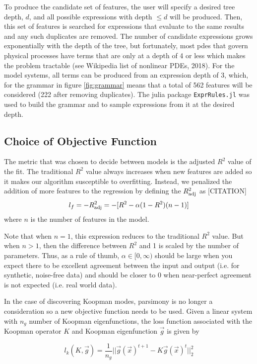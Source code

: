 \documentclass{article}
\begin{document}
To produce the candidate set of features, the user will specify a desired tree depth, $d$, and all possible expressions with depth $\leq d$ will be produced. Then, this set of features is searched for expressions that evaluate to the same results and any such duplicates are removed. The number of candidate expressions grows exponentially with the depth of the tree, but fortunately, most pdes that govern physical processes have terms that are only at a depth of 4 or less which makes the problem tractable (see Wikipedia list of nonlinear PDEs, 2018). For the model systems, all terms can be produced from an expression depth of 3, which, for the grammar in figure \ref{fig:grammar} means that a total of 562 features will be considered (222 after removing duplicates). The julia package \verb|ExprRules.jl| was used to build the grammar and to sample expressions from it at the desired depth.

\subsection{Choice of Objective Function}

The metric that was chosen to decide between models is the adjusted $R^2$ value of the fit. The traditional $R^2$ value always increases when new features are added so it makes our algorithm susceptible to overfitting. Instead, we penalized the addition of more features to the regression by defining the $R_{\rm adj}^2$ as [CITATION]
\[ l_f = -R_{\rm adj}^2 = -[R^2 - \alpha (1-  R^2)(n-1)]\]
where $n$ is the number of features in the model.

Note that when $n=1$, this expression reduces to the traditional $R^2$ value. But when $n>1$, then the difference between $R^2$ and 1 is scaled by the number of parameters. Thus, as a rule of thumb, $\alpha \in [0, \infty)$ should be large when you expect there to be excellent agreement between the input and output (i.e. for synthetic, noise-free data) and should be closer to 0 when near-perfect agreement is not expected (i.e. real world data).

In the case of discovering Koopman modes, parsimony is no longer a consideration so a new objective function needs to be used. Given a linear system with $n_g$ number of Koopman eigenfunctions, the loss function associated with the Koopman operator $K$ and Koopman eigenfunction $\vec{g}$ is given by

\[ l_k(K, \vec{g}) = \frac{1}{n_g}||\vec{g}(\vec{x})^{t+1} - K \vec{g}(\vec{x})^{t}||_2^2 \]
\end{document}
